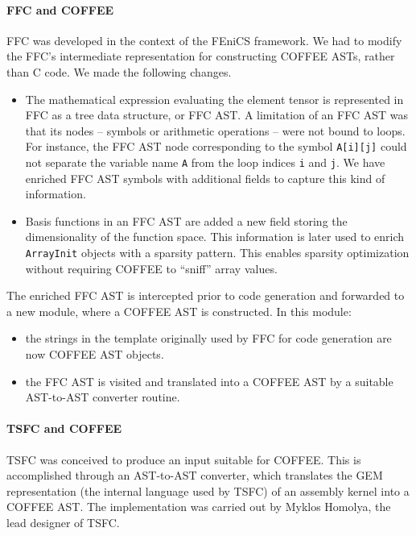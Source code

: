 \paragraph{FFC and COFFEE}
FFC was developed in the context of the FEniCS framework. We had to modify the FFC's intermediate representation for constructing COFFEE ASTs, rather than C code. We made the following changes.
\begin{itemize}
\item The mathematical expression evaluating the element tensor is represented in FFC as a tree data structure, or FFC AST. A limitation of an FFC AST was that its nodes -- symbols or arithmetic operations -- were not bound to loops. For instance, the FFC AST node corresponding to the symbol \texttt{A[i][j]} could not separate the variable name \texttt{A} from the loop indices \texttt{i} and \texttt{j}. We have enriched FFC AST symbols with additional fields to capture this kind of information.
\item Basis functions in an FFC AST are added a new field storing the dimensionality of the function space. This information is later used to enrich \texttt{ArrayInit} objects with a sparsity pattern. This enables sparsity optimization without requiring COFFEE to ``sniff'' array values.
\end{itemize}

The enriched FFC AST is intercepted prior to code generation and forwarded to a new module, where a COFFEE AST is constructed. In this module:
\begin{itemize}
\item the strings in the template originally used by FFC for code generation are now COFFEE AST objects.
\item the FFC AST is visited and translated into a COFFEE AST by a suitable AST-to-AST converter routine.
\end{itemize}

\paragraph{TSFC and COFFEE}
TSFC was conceived to produce an input suitable for COFFEE. This is accomplished through an AST-to-AST converter, which translates the GEM representation (the internal language used by TSFC) of an assembly kernel into a COFFEE AST. The implementation was carried out by Myklos Homolya, the lead designer of TSFC.


